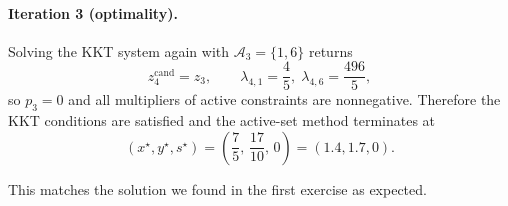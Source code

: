 \documentclass[11pt]{article}
\begin{document}
\paragraph{Iteration 3 (optimality).}
Solving the KKT system again with \(\mathcal{A}_3 = \{1,6\}\) returns
\[
z_4^{\text{cand}} = z_3,\qquad
\lambda_{4,1} = \frac{4}{5},\;
\lambda_{4,6} = \frac{496}{5},
\]
so \(p_3 = 0\) and all multipliers of active constraints are nonnegative.
Therefore the KKT conditions are satisfied and the active-set method terminates
at
\[
(x^\star,y^\star,s^\star) =
\left(\frac{7}{5},\,\frac{17}{10},\,0\right) = \left(1.4, 1.7, 0\right).
\]

This matches the solution we found in the first exercise as expected.
\end{document}
